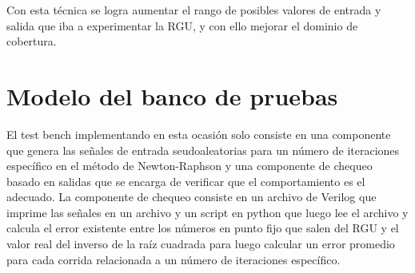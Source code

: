 Con esta técnica se logra aumentar el rango de posibles valores de entrada y salida que iba a experimentar la RGU, y con ello mejorar el dominio de cobertura.

\section{Modelo del banco de pruebas}

El test bench implementando en esta ocasión solo consiste en una componente que genera las señales de entrada seudoaleatorias
para un número de iteraciones específico en el método de Newton-Raphson y una componente de chequeo basado en salidas que se encarga de verificar que el comportamiento es el adecuado.
La componente de chequeo consiste en un archivo de Verilog que imprime las señales en un archivo y un script en python que luego lee el archivo y calcula el error existente entre los números en punto fijo que salen del RGU y el valor real del inverso de la raíz cuadrada para luego calcular un error promedio para cada corrida relacionada a un número de iteraciones específico.

